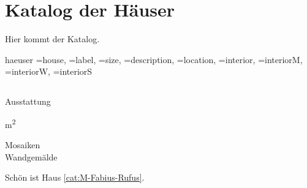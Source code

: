 

\chapter{Katalog der Häuser}

Hier kommt der Katalog.

\DTLforeach%
  {haeuser}%
  {\house=house,%
   \mylabel=label,%
   \size=size,%
   \mydescription=description,%
   \location=location,%
   \interior=interior,%
   \interiorM=interiorM,%
   \interiorW=interiorW,%
   \interiorS=interiorS}
 {\section{\house}
 \label{cat:\mylabel}%
 \mydescription
 \begin{labeling}{Ausstattung}
   \item[Größe]\size m\textsuperscript{2}
   \item[Ort]\location
   \item [Ausstattung]\ifdefempty{\interior}{~}{\interior}
   \begin{description}
   	\item[Mosaiken]\interiorM
   	\item[Wandgemälde]\interiorW
   	\ifdefempty{\interiorS}{~}{\item[Skulptur]\interiorS}
   \end{description}
 \end{labeling}%
 }

Schön ist Haus \ref{cat:M-Fabius-Rufus}.